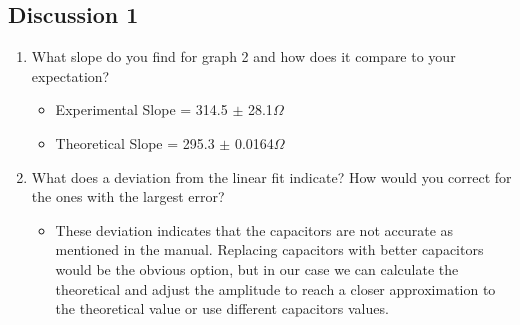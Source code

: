 \documentclass{article}
\begin{document}
\begin{center}
\subsection*{Discussion 1}
  \begin{enumerate}
    \item What slope do you find for graph 2 and how does it compare to your expectation?
    \begin{itemize}
      \item Experimental Slope = 314.5 \(\pm \) 28.1\(\Omega \)
      \item Theoretical Slope = 295.3 \(\pm \) 0.0164\(\Omega \)
    \end{itemize}
      \item What does a deviation from the linear fit indicate? How would you correct for the ones with the largest error?
    \begin{itemize}
      \item These deviation indicates that the capacitors are not accurate as mentioned in the manual. Replacing capacitors with better capacitors would be the obvious option, but in our case we can calculate the theoretical and adjust the amplitude to reach a closer approximation to the theoretical value or use different capacitors values.
    \end{itemize}
  \end{enumerate}
\end{center}
\end{document}
